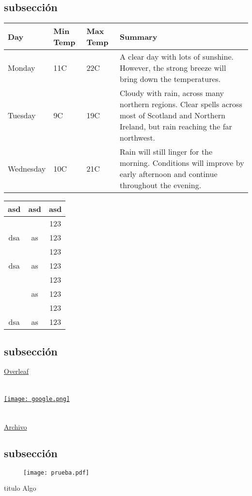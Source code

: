 \subsection{subsecci\'on}
\begin{center}
    \begin{tabular}{ | l | l | l | p{5cm} |}
    \hline
    Day & Min Temp & Max Temp & Summary \\ \hline
    Monday & 11C & 22C & A clear day with lots of sunshine.
    However, the strong breeze will bring down the temperatures. \\ \hline
    Tuesday & 9C & 19C & Cloudy with rain, across many northern regions. Clear spells
    across most of Scotland and Northern Ireland,
    but rain reaching the far northwest. \\ \hline
    Wednesday & 10C & 21C & Rain will still linger for the morning.
    Conditions will improve by early afternoon and continue
    throughout the evening. \\
    \hline
    \end{tabular}
\end{center}

\begin{center}
\begin{tabular}{|c|c|c|}
  \hline
  \textbf{asd}     & \textbf{asd} & \textbf{asd}\\\hline\hline
      &			     			  & 123 \\ \cline{3-3}
  dsa& \multirow{-2}{*}{as} & 123\\ \hline
      &			                  & 123 \\ \cline{3-3}
  dsa& \multirow{-2}{*}{as} & 123\\ \hline
              &			& 123\\ \cline{3-3}
                & \multirow{-2}{*}{as} & 123\\ \cline{2-2}\cline{3-3}
               & 			&123\\ \cline{3-3}
  \multirow{-4}{*}{dsa} & \multirow{-2}{*}{as} & 123\\\hline
\end{tabular}
\end{center}

\subsection{subsecci\'on}
\href{https://www.overleaf.com}{Overleaf}\\\\\\
\href{http://www.google.com.ar}{\texttt{[image: google.png]}}\\\\\\
\href{run:Documents/prueba.pdf}{Archivo}

\subsection{subsecci\'on}

\begin{figure}[H]
\centering
\texttt{[image: prueba.pdf]}
\end{figure}

\begin{mybox}{titulo}
  Algo
\end{mybox}
